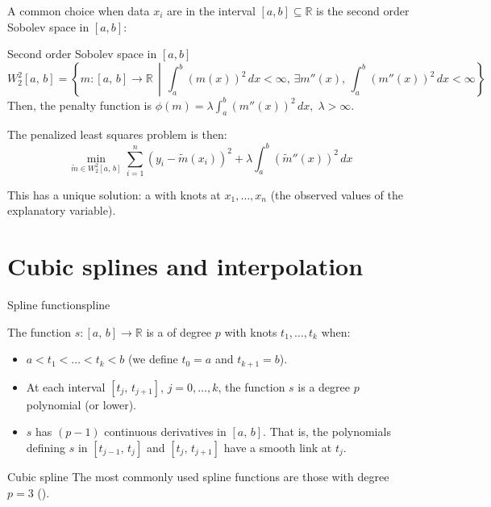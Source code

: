 A common choice when data $x_i$ are in the interval $[a,b] \subseteq \mathbb{R}$ is
the second order Sobolev space in $[a,b]$:
\begin{definition}{Second order Sobolev space}{} in $[a, b]$
    \begin{equation*}
        W_2^2[a,\,b] = \left\{
            m : [a,\,b] \to \mathbb{R} \,\middle|\,
            \int_a^b \left(m(x)\right)^2 \,dx < \infty,\,
            \exists m''(x),\,
            \int_a^b \left(m''(x)\right)^2 \,dx < \infty
            \right\}
    \end{equation*}
    \tcbline
    Then, the penalty function is $\phi(m) = \lambda \int_a^b \left(m''(x)\right)^2 \,dx,\;\lambda > \infty$.

    The penalized least squares problem is then:
    \begin{equation*}
        \min_{\tilde m \in W_2^2[a,\,b]}
        \sum_{i=1}^n \left(y_i - \tilde m(x_i)\right)^2
        + \lambda \int_a^b \left(\tilde m''(x)\right)^2 \,dx
    \end{equation*}

    This has a unique solution: a  with knots at $x_1,\ldots,x_n$
    (the observed values of the explanatory variable).
\end{definition}


\section[Cubic splines interpolation]{Cubic splines and interpolation}

\begin{definition}{Spline function}{spline}

    The function $s : [a,\,b] \to \mathbb{R}$ is a  of
    degree $p$ with knots $t_1, \ldots, t_k$ when:
    \begin{itemize}
        \item $a < t_1 < \ldots < t_k < b$ (we define $t_0 = a$ and $t_{k+1} = b$).
        \item At each interval $[t_j,\, t_{j+1}]$, $j=0,\ldots,k$, the function $s$ is
            a degree $p$ polynomial (or lower).
        \item $s$ has $(p-1)$ continuous derivatives in $[a,\,b]$. That is,
            the polynomials defining $s$ in $[t_{j-1},\, t_{j}]$ and $[t_j,\, t_{j+1}]$
            have a smooth link at $t_j$.
    \end{itemize}
    \tcblower
    \begin{note}{Cubic spline}{}
        The most commonly used spline functions are those with degree $p=3$ ().
    \end{note}
\end{definition}

